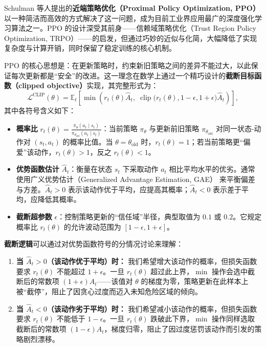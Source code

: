 Schulman 等人提出的\textbf{近端策略优化（Proximal Policy Optimization, PPO）}\cite{schulman2017proximalpolicyoptimizationalgorithms} 以一种简洁而高效的方式解决了这一问题，成为目前工业界应用最广的深度强化学习算法之一。PPO 的设计深受其前身——信赖域策略优化（Trust Region Policy Optimization, TRPO）\cite{schulman2017trustregionpolicyoptimization}——的启发，但通过巧妙的近似与化简，大幅降低了实现复杂度与计算开销，同时保留了稳定训练的核心机制。

PPO 的核心思想是：在更新策略时，约束新旧策略之间的差异不能过大，以此保证每次更新都是“安全”的改进。这一理念在数学上通过一个精巧设计的\textbf{截断目标函数（clipped objective）}实现，其完整形式为：
\begin{equation}\label{eq:ppo_clip}
\mathcal{L}^{\text{CLIP}}(\theta) = \mathbb{E}_t \left[ \min\left(
r_t(\theta) \hat{A}_t, \;
\operatorname{clip}\big(r_t(\theta), 1-\epsilon, 1+\epsilon\big) \hat{A}_t
\right) \right],
\end{equation}
其中各符号含义如下：
\begin{itemize}
\item \textbf{概率比} $r_t(\theta) = \frac{\pi_\theta(a_t \mid s_t)}{\pi_{\theta_{\text{old}}}(a_t \mid s_t)}$：当前策略 $\pi_\theta$ 与更新前旧策略 $\pi_{\theta_{\text{old}}}$ 对同一状态-动作对 $(s_t, a_t)$ 的概率比值。当 $\theta = \theta_{\text{old}}$ 时，$r_t(\theta) = 1$；若当前策略更“偏爱”该动作，$r_t(\theta) > 1$，反之 $r_t(\theta) < 1$。

\item \textbf{优势函数估计} $\hat{A}_t$：衡量在状态 $s_t$ 下采取动作 $a_t$ 相比平均水平的优劣。通常使用广义优势估计（Generalized Advantage Estimation, GAE）\cite{schulman2018highdimensionalcontinuouscontrolusing} 来平衡偏差与方差。$\hat{A}_t > 0$ 表示该动作优于平均，应提高其概率；$\hat{A}_t < 0$ 表示差于平均，应降低其概率。

\item \textbf{截断超参数} $\epsilon$：控制策略更新的“信任域”半径，典型取值为 $0.1$ 或 $0.2$。它规定概率比 $r_t(\theta)$ 的允许波动范围为 $[1-\epsilon, 1+\epsilon]$。
\end{itemize}

\textbf{截断逻辑}可以通过对优势函数符号的分情况讨论来理解：
\begin{enumerate}
\item \textbf{当 $\hat{A}_t > 0$（该动作优于平均）时：} 我们希望增大该动作的概率，但损失函数要求 $r_t(\theta)$ 不能超过 $1+\epsilon$。一旦 $r_t(\theta)$ 超过此上界，$\min$ 操作会选中截断后的常数项 $(1+\epsilon)\hat{A}_t$——该值对 $\theta$ 的梯度为零，策略更新在此样本上被“截停”，阻止了因贪心过度而迈入未知危险区域的倾向。

\item \textbf{当 $\hat{A}_t < 0$（该动作劣于平均）时：} 我们希望减小该动作的概率，但损失函数要求 $r_t(\theta)$ 不能低于 $1-\epsilon$。一旦 $r_t(\theta)$ 跌破此下界，$\min$ 操作同样选取截断后的常数项 $(1-\epsilon)\hat{A}_t$，梯度归零，阻止了因过度惩罚该动作而引发的策略剧烈漂移。
\end{enumerate}

